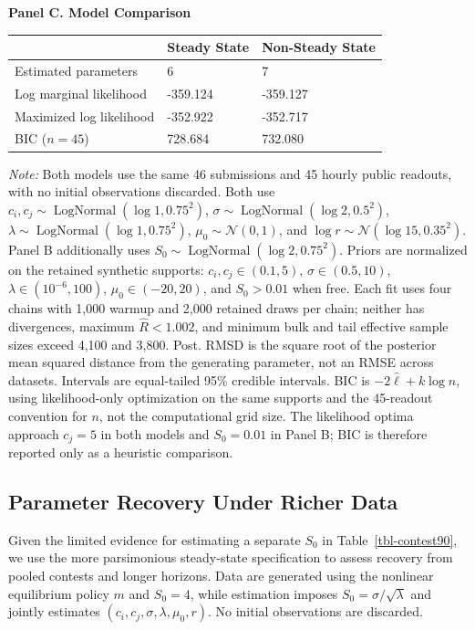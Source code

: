 \documentclass[mnsc]{informs3}
\begin{document}
\begin{table}[tbp]
\textbf{Panel C. Model Comparison}\par
\smallskip
\begin{tabularx}{\textwidth}{lYY}
\toprule
 & Steady State & Non-Steady State \\
\midrule
Estimated parameters & 6 & 7 \\
Log marginal likelihood & -359.124 & -359.127 \\
Maximized log likelihood & -352.922 & -352.717 \\
BIC ($n=45$) & 728.684 & 732.080 \\
\bottomrule
\end{tabularx}
\begin{minipage}{\textwidth}
{\footnotesize
\medskip
\textit{Note:} Both models use the same 46 submissions and 45 hourly public readouts, with no initial observations discarded. Both use $c_i,c_j\sim\operatorname{LogNormal}(\log1,0.75^2)$, $\sigma\sim\operatorname{LogNormal}(\log2,0.5^2)$, $\lambda\sim\operatorname{LogNormal}(\log1,0.75^2)$, $\mu_0\sim\mathcal N(0,1)$, and $\log r\sim\mathcal N(\log15,0.35^2)$. Panel B additionally uses $S_0\sim\operatorname{LogNormal}(\log2,0.75^2)$. Priors are normalized on the retained synthetic supports: $c_i,c_j\in(0.1,5)$, $\sigma\in(0.5,10)$, $\lambda\in(10^{-6},100)$, $\mu_0\in(-20,20)$, and $S_0>0.01$ when free. Each fit uses four chains with 1,000 warmup and 2,000 retained draws per chain; neither has divergences, maximum $\widehat R<1.002$, and minimum bulk and tail effective sample sizes exceed 4,100 and 3,800. Post. RMSD is the square root of the posterior mean squared distance from the generating parameter, not an RMSE across datasets. Intervals are equal-tailed 95\% credible intervals. BIC is $-2\hat\ell+k\log n$, using likelihood-only optimization on the same supports and the 45-readout convention for $n$, not the computational grid size. The likelihood optima approach $c_j=5$ in both models and $S_0=0.01$ in Panel B; BIC is therefore reported only as a heuristic comparison.
}
\end{minipage}
\end{table}


\subsection{Parameter Recovery Under Richer Data}\label{sect-synthetic-richer}

{Given the limited evidence for estimating a separate $S_0$ in Table~\ref{tbl-contest90}, we use the more parsimonious steady-state specification to assess recovery from pooled contests and longer horizons. Data are generated using the nonlinear equilibrium policy $m$ and $S_0=4$, while estimation imposes $S_0=\sigma/\sqrt\lambda$ and jointly estimates $(c_i,c_j,\sigma,\lambda,\mu_0,r)$. No initial observations are discarded.}
\end{document}
